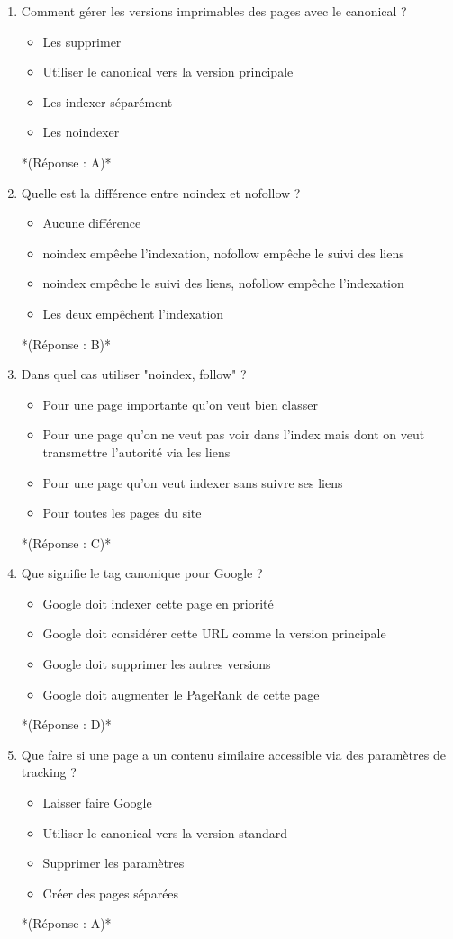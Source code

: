 \documentclass[12pt,a4paper,twoside]{report}
\begin{document}
\begin{enumerate}
\item Comment gérer les versions imprimables des pages avec le canonical ?
\begin{itemize}
\item[A)] Les supprimer
\item[B)] Utiliser le canonical vers la version principale
\item[C)] Les indexer séparément
\item[D)] Les noindexer
\end{itemize}
*(Réponse : A)*

\item Quelle est la différence entre noindex et nofollow ?
\begin{itemize}
\item[A)] Aucune différence
\item[B)] noindex empêche l'indexation, nofollow empêche le suivi des liens
\item[C)] noindex empêche le suivi des liens, nofollow empêche l'indexation
\item[D)] Les deux empêchent l'indexation
\end{itemize}
*(Réponse : B)*

\item Dans quel cas utiliser "noindex, follow" ?
\begin{itemize}
\item[A)] Pour une page importante qu'on veut bien classer
\item[B)] Pour une page qu'on ne veut pas voir dans l'index mais dont on veut transmettre l'autorité via les liens
\item[C)] Pour une page qu'on veut indexer sans suivre ses liens
\item[D)] Pour toutes les pages du site
\end{itemize}
*(Réponse : C)*

\item Que signifie le tag canonique pour Google ?
\begin{itemize}
\item[A)] Google doit indexer cette page en priorité
\item[B)] Google doit considérer cette URL comme la version principale
\item[C)] Google doit supprimer les autres versions
\item[D)] Google doit augmenter le PageRank de cette page
\end{itemize}
*(Réponse : D)*

\item Que faire si une page a un contenu similaire accessible via des paramètres de tracking ?
\begin{itemize}
\item[A)] Laisser faire Google
\item[B)] Utiliser le canonical vers la version standard
\item[C)] Supprimer les paramètres
\item[D)] Créer des pages séparées
\end{itemize}
*(Réponse : A)*


\end{enumerate}
\end{document}

